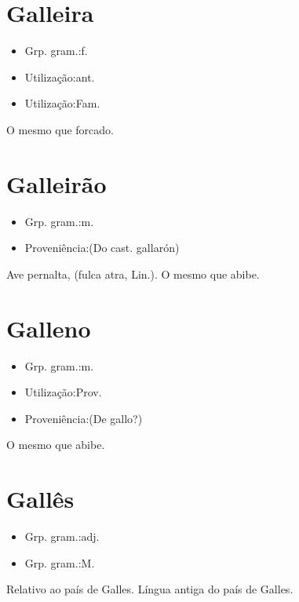 \section{Galleira}
\begin{itemize}
\item {Grp. gram.:f.}
\end{itemize}
\begin{itemize}
\item {Utilização:ant.}
\end{itemize}
\begin{itemize}
\item {Utilização:Fam.}
\end{itemize}
O mesmo que \textunderscore forcado\textunderscore .
\section{Galleirão}
\begin{itemize}
\item {Grp. gram.:m.}
\end{itemize}
\begin{itemize}
\item {Proveniência:(Do cast. \textunderscore gallarón\textunderscore )}
\end{itemize}
Ave pernalta, (\textunderscore fulca atra\textunderscore , Lin.).
O mesmo que \textunderscore abibe\textunderscore .
\section{Galleno}
\begin{itemize}
\item {Grp. gram.:m.}
\end{itemize}
\begin{itemize}
\item {Utilização:Prov.}
\end{itemize}
\begin{itemize}
\item {Proveniência:(De \textunderscore gallo\textunderscore ?)}
\end{itemize}
O mesmo que \textunderscore abibe\textunderscore .
\section{Gallês}
\begin{itemize}
\item {Grp. gram.:adj.}
\end{itemize}
\begin{itemize}
\item {Grp. gram.:M.}
\end{itemize}
Relativo ao país de Galles.
Língua antiga do país de Galles.
